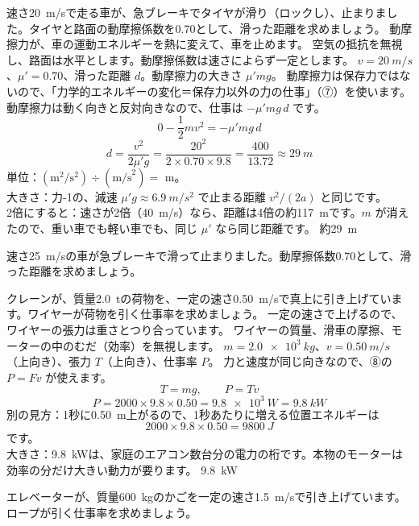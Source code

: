 \label{ph:力-4:ex5}
\begin{phreidai}[タイヤが滑って止まるまでの距離]
速さ\qty{20}{m/s}で走る車が、急ブレーキでタイヤが滑り（ロックし）、止まりました。タイヤと路面の動摩擦係数を0.70として、滑った距離を求めましょう。
\phbamen
動摩擦力が、車の運動エネルギーを熱に変えて、車を止めます。
\phmushi
空気の抵抗を無視し、路面は水平とします。動摩擦係数は速さによらず一定とします。
\phzu
$v=\qty{20}{m/s}$、$\mu'=0.70$、滑った距離 $d$。動摩擦力の大きさ $\mu'mg$。
\phriyu
動摩擦力は保存力ではないので、「力学的エネルギーの変化＝保存力以外の力の仕事」（⑦）を使います。動摩擦力は動く向きと反対向きなので、仕事は $-\mu'mg\,d$ です。
\phtateru
\[0-\frac{1}{2}mv^2=-\mu'mg\,d\]
\phtoku
\[d=\frac{v^2}{2\mu'g}=\frac{20^2}{2\times0.70\times9.8}=\frac{400}{13.72}\approx\qty{29}{m}\]
\phtashikame
単位：$(\text{m}^2/\text{s}^2)\div(\text{m/s}^2)=$ m。\\
大きさ：力-1の、減速 $\mu'g\approx\qty{6.9}{m/s^2}$ で止まる距離 $v^2/(2a)$ と同じです。\\
2倍にすると：速さが2倍（\qty{40}{m/s}）なら、距離は4倍の約\qty{117}{m}です。$m$ が消えたので、重い車でも軽い車でも、同じ $\mu'$ なら同じ距離です。
\kotae 約\qty{29}{m}
\end{phreidai}
\begin{jibun}
速さ\qty{25}{m/s}の車が急ブレーキで滑って止まりました。動摩擦係数0.70として、滑った距離を求めましょう。
\end{jibun}

\label{ph:力-4:ex6}
\begin{phreidai}[クレーンのモーターの動力]
クレーンが、質量\qty{2.0}{t}の荷物を、一定の速さ\qty{0.50}{m/s}で真上に引き上げています。ワイヤーが荷物を引く仕事率を求めましょう。
\phbamen
一定の速さで上げるので、ワイヤーの張力は重さとつり合っています。
\phmushi
ワイヤーの質量、滑車の摩擦、モーターの中のむだ（効率）を無視します。
\phzu
$m=\qty{2.0e3}{kg}$、$v=\qty{0.50}{m/s}$（上向き）、張力 $T$（上向き）、仕事率 $P$。
\phriyu
力と速度が同じ向きなので、⑧の $P=Fv$ が使えます。
\phtateru
\[T=mg,\qquad P=Tv\]
\phtoku
\[P=2000\times9.8\times0.50=\qty{9.8e3}{W}=\qty{9.8}{kW}\]
\phtashikame
別の見方：1秒に\qty{0.50}{m}上がるので、1秒あたりに増える位置エネルギーは
\[2000\times9.8\times0.50=\qty{9800}{J}\]
です。\\
大きさ：\qty{9.8}{kW}は、家庭のエアコン数台分の電力の桁です。本物のモーターは効率の分だけ大きい動力が要ります。
\kotae \qty{9.8}{kW}
\end{phreidai}
\begin{jibun}
エレベーターが、質量\qty{600}{kg}のかごを一定の速さ\qty{1.5}{m/s}で引き上げています。ロープが引く仕事率を求めましょう。
\end{jibun}

